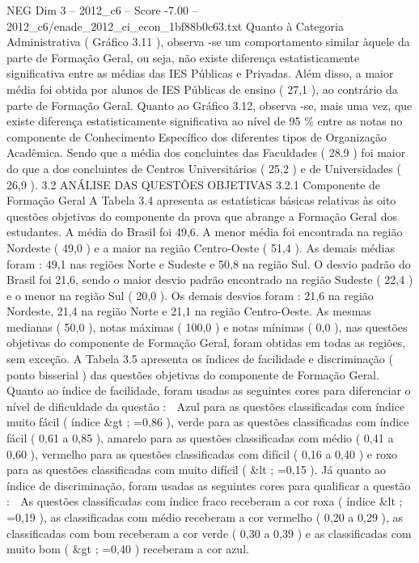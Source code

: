 \begin{textsample}{NEG Dim 3 – 2012\_c6 – Score -7.00 – 2012\_c6/enade\_2012\_ci\_econ\_1bf88b0c63.txt}
Quanto à Categoria Administrativa ( Gráfico 3.11 ), observa -se um comportamento similar àquele da parte de Formação Geral, ou seja, não existe diferença estatisticamente significativa entre as médias das IES Públicas e Privadas.
Além disso, a maior média foi obtida por alunos de IES Públicas de ensino ( 27,1 ), ao contrário da parte de Formação Geral.
Quanto ao Gráfico 3.12, observa -se, mais uma vez, que existe diferença estatisticamente significativa ao nível de 95 \% entre as notas no componente de Conhecimento Específico dos diferentes tipos de Organização Acadêmica.
Sendo que a média dos concluintes das Faculdades ( 28,9 ) foi maior do que a dos concluintes de Centros Universitários ( 25,2 ) e de Universidades ( 26,9 ). 3.2 ANÁLISE DAS QUESTÕES OBJETIVAS 3.2.1 Componente de Formação Geral A Tabela 3.4 apresenta as estatísticas básicas relativas às oito questões objetivas do componente da prova que abrange a Formação Geral dos estudantes.
A média do Brasil foi 49,6.
A menor média foi encontrada na região Nordeste ( 49,0 ) e a maior na região Centro-Oeste ( 51,4 ).
As demais médias foram : 49,1 nas regiões Norte e Sudeste e 50,8 na região Sul.
O desvio padrão do Brasil foi 21,6, sendo o maior desvio padrão encontrado na região Sudeste ( 22,4 ) e o menor na região Sul ( 20,0 ).
Os demais desvios foram : 21,6 na região Nordeste, 21,4 na região Norte e 21,1 na região Centro-Oeste.
As mesmas medianas ( 50,0 ), notas máximas ( 100,0 ) e notas mínimas ( 0,0 ), nas questões objetivas do componente de Formação Geral, foram obtidas em todas as regiões, sem exceção.
A Tabela 3.5 apresenta os índices de facilidade e discriminação ( ponto bisserial ) das questões objetivas do componente de Formação Geral.
Quanto ao índice de facilidade, foram usadas as seguintes cores para diferenciar o nível de dificuldade da questão :  Azul para as questões classificadas com índice muito fácil ( índice \&gt ; =0,86 ), verde para as questões classificadas com índice fácil ( 0,61 a 0,85 ), amarelo para as questões classificadas com médio ( 0,41 a 0,60 ), vermelho para as questões classificadas com difícil ( 0,16 a 0,40 ) e roxo para as questões classificadas com muito difícil ( \&lt ; =0,15 ).
Já quanto ao índice de discriminação, foram usadas as seguintes cores para qualificar a questão :  As questões classificadas com índice fraco receberam a cor roxa ( índice \&lt ; =0,19 ), as classificadas com médio receberam a cor vermelho ( 0,20 a 0,29 ), as classificadas com bom receberam a cor verde ( 0,30 a 0,39 ) e as classificadas com muito bom ( \&gt ; =0,40 ) receberam a cor azul.

\end{textsample}
